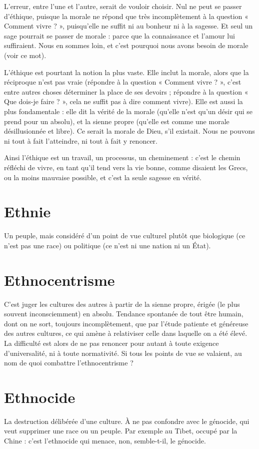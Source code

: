 L'erreur, entre l’une et l’autre, serait de vouloir choisir. Nul ne peut se
passer d'éthique, puisque la morale ne répond que très incomplètement à la
question « Comment vivre ? », puisqu'elle ne suffit ni au bonheur ni à la
sagesse. Et seul un sage pourrait se passer de morale : parce que la connaissance
et l’amour lui suffiraient. Nous en sommes loin, et c’est pourquoi nous avons
besoin de morale (voir ce mot).

L’éthique est pourtant la notion la plus vaste. Elle inclut la morale, alors
que la réciproque n’est pas vraie (répondre à la question « Comment vivre ? »,
c’est entre autres choses déterminer la place de ses devoirs ; répondre à la question
« Que dois-je faire ? », cela ne suffit pas à dire comment vivre). Elle est
aussi la plus fondamentale : elle dit la vérité de la morale (qu’elle n’est qu’un
désir qui se prend pour un absolu), et la sienne propre (qu’elle est comme une
morale désillusionnée et libre). Ce serait la morale de Dieu, s’il existait. Nous
ne pouvons ni tout à fait l’atteindre, ni tout à fait y renoncer.

Ainsi l'éthique est un travail, un processus, un cheminement : c’est le
chemin réfléchi de vivre, en tant qu’il tend vers la vie bonne, comme disaient
les Grecs, ou la moins mauvaise possible, et c’est la seule sagesse en vérité.

\section{Ethnie}
Un peuple, mais considéré d’un point de vue culturel plutôt que
biologique (ce n’est pas une race) ou politique (ce n’est ni une
nation ni un État).

\section{Ethnocentrisme}
C'est juger les cultures des autres à partir de la sienne
propre, érigée (le plus souvent inconsciemment) en
absolu. Tendance spontanée de tout être humain, dont on ne sort, toujours
incomplètement, que par l’étude patiente et généreuse des autres cultures, ce
qui amène à relativiser celle dans laquelle on a été élevé. La difficulté est alors
de ne pas renoncer pour autant à toute exigence d’universalité, ni à toute normativité.
Si tous les points de vue se valaient, au nom de quoi combattre
l’ethnocentrisme ?

\section{Ethnocide}
La destruction délibérée d’une culture. À ne pas confondre
avec le génocide, qui veut supprimer une race ou un peuple.
Par exemple au Tibet, occupé par la Chine : c’est l’ethnocide qui menace, non,
semble-t-il, le génocide.

